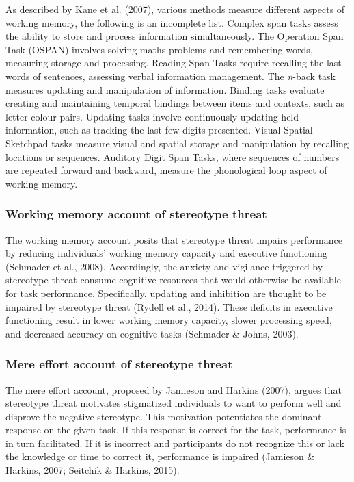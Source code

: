 \documentclass[
  stu, a4paper,floatsintext]{apa7}
\begin{document}
As described by Kane et al. (2007), various methods measure different aspects of working memory, the following is an incomplete list.
Complex span tasks assess the ability to store and process information simultaneously.
The Operation Span Task (OSPAN) involves solving maths problems and remembering words, measuring storage and processing.
Reading Span Tasks require recalling the last words of sentences, assessing verbal information management.
The \emph{n}-back task measures updating and manipulation of information.
Binding tasks evaluate creating and maintaining temporal bindings between items and contexts, such as letter-colour pairs.
Updating tasks involve continuously updating held information, such as tracking the last few digits presented.
Visual-Spatial Sketchpad tasks measure visual and spatial storage and manipulation by recalling locations or sequences.
Auditory Digit Span Tasks, where sequences of numbers are repeated forward and backward, measure the phonological loop aspect of working memory.

\subsubsection{Working memory account of stereotype threat}\label{working-memory-account-of-stereotype-threat}

The working memory account posits that stereotype threat impairs performance by reducing individuals' working memory capacity and executive functioning (Schmader et al., 2008).
Accordingly, the anxiety and vigilance triggered by stereotype threat consume cognitive resources that would otherwise be available for task performance.
Specifically, updating and inhibition are thought to be impaired by stereotype threat (Rydell et al., 2014).
These deficits in executive functioning result in lower working memory capacity, slower processing speed, and decreased accuracy on cognitive tasks (Schmader \& Johns, 2003).

\subsubsection{Mere effort account of stereotype threat}\label{mere-effort-account-of-stereotype-threat}

The mere effort account, proposed by Jamieson and Harkins (2007), argues that stereotype threat motivates stigmatized individuals to want to perform well and disprove the negative stereotype.
This motivation potentiates the dominant response on the given task.
If this response is correct for the task, performance is in turn facilitated. If it is incorrect and participants do not recognize this or lack the knowledge or time to correct it, performance is impaired (Jamieson \& Harkins, 2007; Seitchik \& Harkins, 2015).
\end{document}
